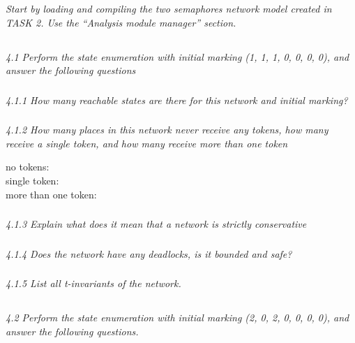 \documentclass[letterpaper]{article}
\begin{document}
\textit{Start by loading and compiling the two semaphores network model created in TASK 2. Use the “Analysis module manager” section.}

\subsection{}
\textit{ 4.1  Perform the state enumeration with initial marking (1, 1, 1, 0, 0, 0, 0), and answer the following questions}

\subsubsection{}
\textit{ 4.1.1  How many reachable states are there for this network and initial marking?}

\subsubsection{}
\textit{ 4.1.2  How many places in this network never receive any tokens, how many receive a single token, and how many receive more than one token}

no tokens: \\
single token: \\
more than one token: \\

\subsubsection{}
\textit{ 4.1.3  Explain what does it mean that a network is strictly conservative}

\subsubsection{}
\textit{ 4.1.4  Does the network have any deadlocks, is it bounded and safe?}

\subsubsection{}
\textit{ 4.1.5  List all t-invariants of the network.}

\subsection{}
\textit{ 4.2  Perform the state enumeration with initial marking (2, 0, 2, 0, 0, 0, 0), and answer the following questions.}
\end{document}
